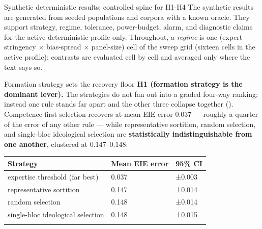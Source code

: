\documentclass[
  ignorenonframetext,
]{beamer}
\newcounter{none} %
\begin{document}
\begin{frame}{Synthetic deterministic results:
controlled spine for H1-H4}
\protect{}\label{synthetic-deterministic-results-controlled-spine-for-h1-h4}
The synthetic results are generated from seeded populations and corpora
with a known oracle. They support strategy, regime, tolerance,
power-budget, alarm, and diagnostic claims for the active deterministic
profile only. Throughout, a \emph{regime} is one (expert-stringency ×
bias-spread × panel-size) cell of the sweep grid (sixteen cells in the
active profile); contrasts are evaluated cell by cell and averaged only
where the text says so.

\begin{block}{Formation strategy sets the recovery floor}
\protect{}\label{formation-strategy-sets-the-recovery-floor}
\textbf{H1 (formation strategy is the dominant lever).} The strategies
do not fan out into a graded four-way ranking; instead one rule stands
far apart and the other three collapse together ().
Competence-first selection recovers at mean EIE error 0.037 --- roughly
a quarter of the error of any other rule --- while representative
sortition, random selection, and single-bloc ideological selection are
\textbf{statistically indistinguishable from one another}, clustered at
0.147--0.148:

{\def\LTcaptype{none} %
\begin{longtable}[]{@{}lll@{}}
\toprule\noalign{}
Strategy & Mean EIE error & 95\% CI \\
\midrule\noalign{}
\endhead
expertise threshold (far best) & 0.037 & ±0.003 \\
representative sortition & 0.147 & ±0.014 \\
random selection & 0.148 & ±0.014 \\
single-bloc ideological selection & 0.148 & ±0.015 \\
\bottomrule\noalign{}
\end{longtable}
}


\end{block}
\end{frame}
\end{document}
